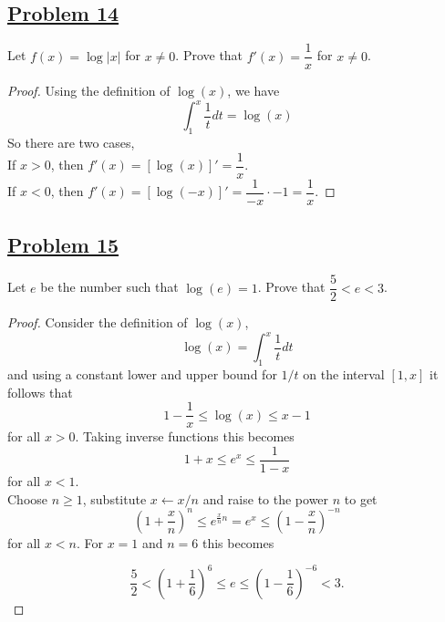 \documentclass[10pt,letterpaper]{article}
\begin{document}
	
	\subsection*{{\color{purple}\underline{Problem 14}}}
	Let $f(x) = \log|x|$ for $x \neq 0$. Prove that $f'(x) = \dfrac{1}{x}$ for $x \neq 0$.
\begin{proof}
	Using the definition of $\log(x)$, we have
	$$\int_1^x \dfrac{1}{t} dt = \log(x)$$
	So there are two cases, \\
	If $x > 0$, then $f'(x) = [\log(x)]' = \dfrac{1}{x}$. \\
	If $x < 0$, then $f'(x) = [\log(-x)]' = \dfrac{1}{-x} \cdot -1 = \dfrac{1}{x}$. 
\end{proof}


	\subsection*{{\color{purple}\underline{Problem 15}}}
	Let $e$ be the number such that $\log(e) = 1$. Prove that $\dfrac{5}{2} < e < 3$.
\begin{proof}
	Consider the definition of $\log(x)$, 
	$$\log(x) = \int_1^x\dfrac{1}{t}dt$$ and using a constant lower and upper bound for $1/t$ on the interval $[1, x]$ it follows that $$1 - \frac{1}{x} \leq \log(x) \leq x - 1$$ for all $x > 0$.  Taking inverse functions this becomes $$1 +x \leq e^x \leq \frac{1}{1-x}$$ for all $x < 1$. \\
	Choose $n \geq 1$, substitute $x \leftarrow x/n$ and raise to the power $n$ to get $$\left(1 + \frac{x}{n}\right)^n \leq e^{\frac{x}{n}n} = e^x \leq \left(1 - \frac{x}{n}\right)^{-n}$$ for all $x < n$.  For $x=1$ and $n=6$ this becomes

$$\frac{5}{2} < \left(1 + \frac{1}{6}\right)^6 \leq e \leq \left(1-\frac{1}{6}\right)^{-6} < 3.$$
	
\end{proof}
	
	
\end{document}
